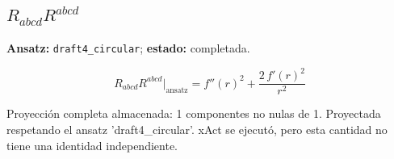 \documentclass[11pt]{article}
\begin{document}
\subsection*{$ R_{abcd}R^{abcd} $}
\textbf{Ansatz:} \texttt{draft4\_circular}; \textbf{estado:} completada.\par
\begin{dmath*}[breakdepth={5}]
R_{abcd}R^{abcd}\big|_{\mathrm{ansatz}} = {f''\!\left(r\right)}^{2} + \frac{2\,{f'\!\left(r\right)}^{2}}{{r}^{2}}
\end{dmath*}
\par\smallskip
Proyección completa almacenada: 1 componentes no nulas de 1. Proyectada respetando el ansatz 'draft4\_circular'. xAct se ejecutó, pero esta cantidad no tiene una identidad independiente.\par\medskip
{}
\end{document}
